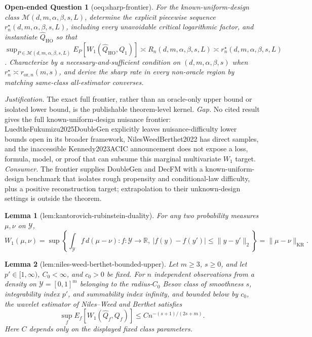 \documentclass{article}
\newtheorem{lemma}{Lemma}
\newtheorem{openendedquestion}{Open-ended Question}
\begin{document}
\begin{openendedquestion}[oeq:sharp-frontier]\label{oeq:sharp-frontier}
For the known-uniform-design class \(\mathcal M(d,m,\alpha,\beta,s,L)\), determine the explicit piecewise sequence \(r_n^{\star}(d,m,\alpha,\beta,s,L)\), including every unavoidable critical logarithmic factor, and instantiate \(\widehat Q_{\mathrm{HO}}\) so that \(\sup_{P\in\mathcal M(d,m,\alpha,\beta,s,L)}E_P[W_1(\widehat Q_{\mathrm{HO}},Q_1)]\asymp R_n(d,m,\alpha,\beta,s,L)\asymp r_n^{\star}(d,m,\alpha,\beta,s,L)\). Characterize by a necessary-and-sufficient condition on \((d,m,\alpha,\beta,s)\) when \(r_n^{\star}\asymp r_{\mathrm{or},n}(m,s)\), and derive the sharp rate in every non-oracle region by matching same-class all-estimator converses.
\end{openendedquestion}
\par\smallskip\noindent \textit{Justification.} The exact full frontier, rather than an oracle-only upper bound or isolated lower bound, is the publishable theorem-level kernel. \textit{Gap.} No cited result gives the full known-uniform-design nuisance frontier: LuedtkeFukumizu2025DoubleGen explicitly leaves nuisance-difficulty lower bounds open in its broader framework, NilesWeedBerthet2022 has direct samples, and the inaccessible Kennedy2023ACIC announcement does not expose a loss, formula, model, or proof that can subsume this marginal multivariate \(W_1\) target. \textit{Consumer.} The frontier supplies DoubleGen and DecFM with a known-uniform-design benchmark that isolates rough propensity and conditional-law difficulty, plus a positive reconstruction target; extrapolation to their unknown-design settings is outside the theorem.

\begin{lemma}[lem:kantorovich-rubinstein-duality]\label{lem:kantorovich-rubinstein-duality}
For any two probability measures \(\mu,\nu\) on \(\mathcal Y\),
\[
 W_1(\mu,\nu)
 =\sup\left\{\int_{\mathcal Y} f\,d(\mu-\nu):
       f:\mathcal Y\to\mathbb R,\ |f(y)-f(y')|\leq\lVert y-y'\rVert_2\right\}
 =\lVert\mu-\nu\rVert_{\mathrm{KR}}.
\]
\end{lemma}

\begin{lemma}[lem:niles-weed-berthet-bounded-upper]\label{lem:niles-weed-berthet-bounded-upper}
Let \(m\geq3\), \(s\geq0\), and let \(p'\in[1,\infty)\), \(C_0<\infty\), and \(c_0>0\) be fixed.  For \(n\) independent observations from a density on \(\mathcal Y=[0,1]^m\) belonging to the radius-\(C_0\) Besov class of smoothness \(s\), integrability index \(p'\), and summability index infinity, and bounded below by \(c_0\), the wavelet estimator of Niles--Weed and Berthet satisfies
\[
 \sup_f E_f\!\left[W_1(\widehat Q_f,Q_f)\right]
 \leq C n^{-(s+1)/(2s+m)}.
\]
Here \(C\) depends only on the displayed fixed class parameters.
\end{lemma}
\end{document}
